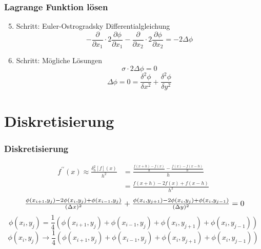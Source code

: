 \documentclass[xcolor=dvipsnames,envcountsect]{beamer}
\begin{document}
\begin{frame}
	\frametitle{Lagrange Funktion lösen}
	\begin{enumerate}
		\setcounter{enumi}{4}
		\item<1-> Schritt: Euler-Ostrogradsky Differentialgleichung
		\begin{equation}
			-\frac{\partial}{\partial x_1}\cdot 2\frac{\partial \phi}{\partial {x_1}}-\frac{\partial}{\partial x_2}\cdot 2\frac{\partial \phi}{\partial {x_2}}=-2\Delta\phi
		\end{equation}
		\item<2-> Schritt: Mögliche Lösungen
		\begin{equation}
			\sigma \cdot 2\Delta\phi=0
		\end{equation}
		\begin{equation}
			\Delta\phi=0=\frac{\delta^2\phi}{\delta x^2}+\frac{\delta^2\phi}{\delta y^2}
			\label{circuit:laplace1}
		\end{equation}
	\end{enumerate}
\end{frame}
\section{Diskretisierung}
\begin{frame}
	\frametitle{Diskretisierung}
	\begin{equation}
		\begin{aligned}
			f^{\prime \prime}(x) \approx \frac{\delta_h^2[f](x)}{h^2}&=\frac{\frac{f(x+h)-f(x)}{h}-\frac{f(x)-f(x-h)}{h}}{h}\\
			&=\frac{f(x+h)-2 f(x)+f(x-h)}{h^2}
		\end{aligned}
		\label{circuit:second-order-central}
	\end{equation}
	\center
	\begin{equation}
	\resizebox{0.9\textwidth}{!}{
	$
		\frac{\phi(x_{i+1}, y_j) - 2\phi(x_i, y_j) + \phi(x_{i-1}, y_j)}{(\Delta x)^2} + \frac{\phi(x_i, y_{j+1}) - 2\phi(x_i, y_j) + \phi(x_i, y_{j-1})}{(\Delta y)^2} = 0
	$}
	\end{equation}
	\begin{equation}
		\phi(x_i, y_j) = \frac{1}{4}(\phi(x_{i+1}, y_{j}) + \phi(x_{i-1}, y_{j}) + \phi(x_{i}, y_{j+1}) + \phi(x_{i}, y_{j-1}))
	\end{equation}
	\begin{equation}
		\phi(x_i, y_j) \to \frac{1}{4}(\phi(x_{i+1}, y_{j}) + \phi(x_{i-1}, y_{j}) + \phi(x_{i}, y_{j+1}) + \phi(x_{i}, y_{j-1}))
	\end{equation}
\end{frame}
\end{document}
